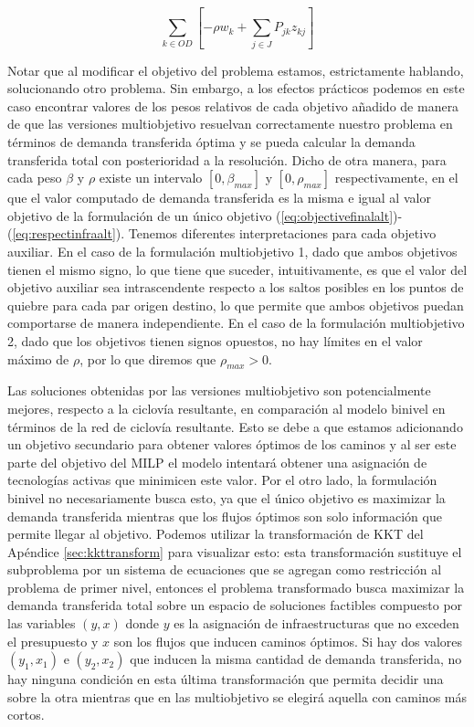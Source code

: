 \begin{equation}
  \label{eq:multipleobj2}
  \sum_{k \in OD} \left[ -\rho w_k + \sum_{j \in J} P_{jk}z_{kj} \right]
\end{equation}

Notar que al modificar el objetivo del problema estamos, estrictamente hablando, solucionando otro problema. Sin embargo, a los efectos prácticos podemos en este caso encontrar valores de los pesos relativos de cada objetivo añadido de manera de que las versiones multiobjetivo resuelvan correctamente nuestro problema en términos de demanda transferida óptima y se pueda calcular la demanda transferida total con posterioridad a la resolución. Dicho de otra manera, para cada peso $\beta$ y $\rho$ existe un intervalo $[0, \beta_{max}]$ y $[0, \rho_{max}]$ respectivamente, en el que el valor computado de demanda transferida es la misma e igual al valor objetivo de la formulación de un único objetivo (\ref{eq:objectivefinalalt})-(\ref{eq:respectinfraalt}). Tenemos diferentes interpretaciones para cada objetivo auxiliar. En el caso de la formulación multiobjetivo 1, dado que ambos objetivos tienen el mismo signo, lo que tiene que suceder, intuitivamente, es que el valor del objetivo auxiliar sea intrascendente respecto a los saltos posibles en los puntos de quiebre para cada par origen destino, lo que permite que ambos objetivos puedan comportarse de manera independiente. En el caso de la formulación multiobjetivo 2, dado que los objetivos tienen signos opuestos, no hay límites en el valor máximo de $\rho$, por lo que diremos que $\rho_{max} > 0$.

Las soluciones obtenidas por las versiones multiobjetivo son potencialmente mejores, respecto a la ciclovía resultante, en comparación al modelo binivel en términos de la red de ciclovía resultante. Esto se debe a que estamos adicionando un objetivo secundario para obtener valores óptimos de los caminos y al ser este parte del objetivo del MILP el modelo intentará obtener una asignación de tecnologías activas que minimicen este valor. Por el otro lado, la formulación binivel no necesariamente busca esto, ya que el único objetivo es maximizar la demanda transferida mientras que los flujos óptimos son solo información que permite llegar al objetivo. Podemos utilizar la transformación de KKT del Apéndice \ref{sec:kkttransform} para visualizar esto: esta transformación sustituye el subproblema por un sistema de ecuaciones que se agregan como restricción al problema de primer nivel, entonces el problema transformado busca maximizar la demanda transferida total sobre un espacio de soluciones factibles compuesto por las variables $(y, x)$ donde $y$ es la asignación de infraestructuras que no exceden el presupuesto y $x$ son los flujos que inducen caminos óptimos. Si hay dos valores $(y_1, x_1)$ e $(y_2, x_2)$ que inducen la misma cantidad de demanda transferida, no hay ninguna condición en esta última transformación que permita decidir una sobre la otra mientras que en las multiobjetivo se elegirá aquella con caminos más cortos.

